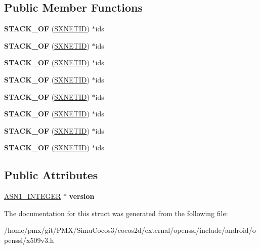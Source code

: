 \subsection*{Public Member Functions}
\begin{DoxyCompactItemize}
\item 
\mbox{\label{structSXNET__st_a1f702e22d6ea6f503c1957c09b9d440f}} 
{\bfseries S\+T\+A\+C\+K\+\_\+\+OF} (\hyperlink{structSXNET__ID__st}{S\+X\+N\+E\+T\+ID}) $\ast$ids
\item 
\mbox{\label{structSXNET__st_a1f702e22d6ea6f503c1957c09b9d440f}} 
{\bfseries S\+T\+A\+C\+K\+\_\+\+OF} (\hyperlink{structSXNET__ID__st}{S\+X\+N\+E\+T\+ID}) $\ast$ids
\item 
\mbox{\label{structSXNET__st_a1f702e22d6ea6f503c1957c09b9d440f}} 
{\bfseries S\+T\+A\+C\+K\+\_\+\+OF} (\hyperlink{structSXNET__ID__st}{S\+X\+N\+E\+T\+ID}) $\ast$ids
\item 
\mbox{\label{structSXNET__st_a1f702e22d6ea6f503c1957c09b9d440f}} 
{\bfseries S\+T\+A\+C\+K\+\_\+\+OF} (\hyperlink{structSXNET__ID__st}{S\+X\+N\+E\+T\+ID}) $\ast$ids
\item 
\mbox{\label{structSXNET__st_a1f702e22d6ea6f503c1957c09b9d440f}} 
{\bfseries S\+T\+A\+C\+K\+\_\+\+OF} (\hyperlink{structSXNET__ID__st}{S\+X\+N\+E\+T\+ID}) $\ast$ids
\item 
\mbox{\label{structSXNET__st_a1f702e22d6ea6f503c1957c09b9d440f}} 
{\bfseries S\+T\+A\+C\+K\+\_\+\+OF} (\hyperlink{structSXNET__ID__st}{S\+X\+N\+E\+T\+ID}) $\ast$ids
\item 
\mbox{\label{structSXNET__st_a1f702e22d6ea6f503c1957c09b9d440f}} 
{\bfseries S\+T\+A\+C\+K\+\_\+\+OF} (\hyperlink{structSXNET__ID__st}{S\+X\+N\+E\+T\+ID}) $\ast$ids
\item 
\mbox{\label{structSXNET__st_a1f702e22d6ea6f503c1957c09b9d440f}} 
{\bfseries S\+T\+A\+C\+K\+\_\+\+OF} (\hyperlink{structSXNET__ID__st}{S\+X\+N\+E\+T\+ID}) $\ast$ids
\end{DoxyCompactItemize}
\subsection*{Public Attributes}
\begin{DoxyCompactItemize}
\item 
\mbox{\label{structSXNET__st_abbadd99d4775989cc192bc3be0b02dfb}} 
\hyperlink{structasn1__string__st}{A\+S\+N1\+\_\+\+I\+N\+T\+E\+G\+ER} $\ast$ {\bfseries version}
\end{DoxyCompactItemize}


The documentation for this struct was generated from the following file\+:\begin{DoxyCompactItemize}
\item 
/home/pmx/git/\+P\+M\+X/\+Simu\+Cocos3/cocos2d/external/openssl/include/android/openssl/x509v3.\+h\end{DoxyCompactItemize}
